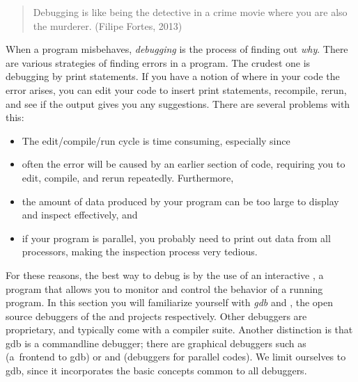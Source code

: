 

\begin{quotation}
  \noindent
  Debugging is like being the detective in a crime movie where you are
  also the murderer. (Filipe Fortes, 2013)
\end{quotation}

When a program misbehaves, \emph{debugging} is the process of finding
out \emph{why}.
There are various strategies of finding errors in a program.
The crudest one is debugging by print statements. If you have a
notion of where in your code the error arises, you can edit your code
to insert print statements, recompile, rerun, and see if the output
gives you any suggestions. There are several problems with this:
\begin{itemize}
\item The edit/compile/run cycle is time consuming, especially since
\item often the error will be caused by an earlier section of code,
  requiring you to edit, compile, and rerun repeatedly. Furthermore,
\item the amount of data produced by your program can be too large to
  display and inspect effectively, and
\item if your program is parallel, you probably need to print out data
  from all processors, making the inspection process very tedious.
\end{itemize}


For these reasons, the best way to debug is by the use of an
interactive , a program that allows you to monitor
and control the behavior of a running program. In this section you
will familiarize yourself with
\emph{gdb} and
,
the open source
debuggers of the  and  projects respectively.
Other debuggers are
proprietary, and typically come with a compiler suite. Another
distinction is that gdb is a commandline debugger; there are
graphical debuggers such as  (a~frontend to gdb) or
 and  (debuggers for parallel
codes). We limit ourselves to gdb, since it incorporates the basic
concepts common to all debuggers.


